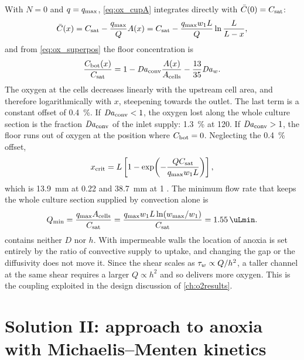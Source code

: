 With $N=0$ and $q=q_{\max}$, \cref{eq:ox_cupA} integrates directly with $\bar C(0)=C_{\mathrm{sat}}$:
\begin{equation}
\bar C(x)=C_{\mathrm{sat}}-\frac{q_{\max}}{Q}A(x)=C_{\mathrm{sat}}-\frac{q_{\max} w_1L}{Q}\ln\frac{L}{L-x},
\label{eq:ox_imp}
\end{equation}
and from \cref{eq:ox_superpos} the floor concentration is
\begin{equation}
\frac{C_{\mathrm{bot}}(x)}{C_{\mathrm{sat}}}=1-\mathit{Da}_{\mathrm{conv}}\frac{A(x)}{A_{\mathrm{cells}}}-\frac{13}{35}\mathit{Da}_w .
\label{eq:ox_imp_bot}
\end{equation}
The oxygen at the cells decreases linearly with the upstream cell area, and therefore logarithmically with $x$, steepening towards the outlet. The last term is a constant offset of \SI{0.4}{\percent}. If $\mathit{Da}_{\mathrm{conv}}<1$, the oxygen lost along the whole culture section is the fraction $\mathit{Da}_{\mathrm{conv}}$ of the inlet supply: \SI{1.3}{\percent} at \SI{120}{\uLmin}. If $\mathit{Da}_{\mathrm{conv}}>1$, the floor runs out of oxygen at the position where $C_{\mathrm{bot}}=0$. Neglecting the \SI{0.4}{\percent} offset,
\begin{equation}
x_{\mathrm{crit}}=L\left[1-\exp\!\left(-\frac{QC_{\mathrm{sat}}}{q_{\max} w_1L}\right)\right],
\label{eq:ox_xcrit}
\end{equation}
which is \SI{13.9}{mm} at \SI{0.22}{\uLmin} and \SI{38.7}{mm} at \SI{1}{\uLmin} \tagM. The minimum flow rate that keeps the whole culture section supplied by convection alone is
\begin{equation}
Q_{\min}=\frac{\qmax A_{\mathrm{cells}}}{\Csat}=\frac{\qmax w_1L\ln(w_{\max}/w_1)}{\Csat}=\SI{1.55}{\uLmin}.
\label{eq:ox_qmin}
\end{equation}
 contains neither $D$ nor $h$. With impermeable walls the location of anoxia is set entirely by the ratio of convective supply to uptake, and changing the gap or the diffusivity does not move it. Since the shear scales as $\tau_{w}\propto Q/h^2$, a taller channel at the same shear requires a larger $Q\propto h^2$ and so delivers more oxygen. This is the coupling exploited in the design discussion of \cref{ch:o2results}.

\section{Solution II: approach to anoxia with Michaelis--Menten kinetics}
\label{sec:ox_mm}

